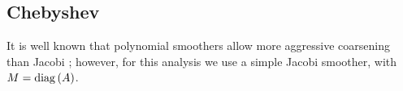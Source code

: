 \subsection{Chebyshev}

It is well known that polynomial smoothers allow more aggressive coarsening than Jacobi \cite{brannick2015polynomial};
however, for this analysis we use a simple Jacobi smoother, with $M = \operatorname{diag} \left( A \right)$.
